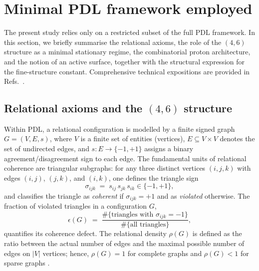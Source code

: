 \documentclass[11pt,a4paper]{article}
\numberwithin{equation}{section}
\begin{document}
\section{Minimal PDL framework employed}
\label{sec:PDL_minimal}

The present study relies only on a restricted subset of the full PDL framework. In this section, we briefly summarise the relational axioms, the role of the $(4,6)$ structure as a minimal stationary regime, the combinatorial proton architecture, and the notion of an active surface, together with the structural expression for the fine-structure constant. Comprehensive technical expositions are provided in Refs.~\cite{LaubscherPDLFull2026,LaubscherLDP2026,LaubscherIMRadPDL2026,LaubscherCombinatorialProton2026,LaubscherDerivationAlpha2026,LaubscherGoldenRatioPDL2026}.

\subsection{Relational axioms and the \texorpdfstring{$(4,6)$}{(4,6)} structure}

Within PDL, a relational configuration is modelled by a finite signed graph $G=(V,E,s)$, where $V$ is a finite set of entities (vertices), $E\subseteq V\times V$ denotes the set of undirected edges, and $s:E\to\{-1,+1\}$ assigns a binary agreement/disagreement sign to each edge. The fundamental units of relational coherence are triangular subgraphs: for any three distinct vertices $(i,j,k)$ with edges $(i,j)$, $(j,k)$, and $(i,k)$, one defines the triangle sign
\begin{equation}
  \sigma_{ijk} \;=\; s_{ij}\,s_{jk}\,s_{ik} \in \{-1,+1\},
\end{equation}
and classifies the triangle as \emph{coherent} if $\sigma_{ijk}=+1$ and as \emph{violated} otherwise. The fraction of violated triangles in a configuration $G$,
\begin{equation}
  \epsilon(G) \;=\; \frac{\#\{\text{triangles with }\sigma_{ijk}=-1\}}{\#\{\text{all triangles}\}},
\end{equation}
quantifies its coherence defect. The relational density $\rho(G)$ is defined as the ratio between the actual number of edges and the maximal possible number of edges on $|V|$ vertices; hence, $\rho(G)=1$ for complete graphs and $\rho(G)<1$ for sparse graphs \cite{LaubscherPDLFull2026,LaubscherLDP2026}.
\end{document}
